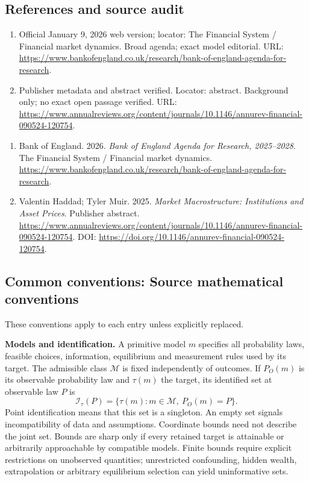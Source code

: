\documentclass[11pt,a4paper]{article}
\begin{document}
\subsection*{References and source audit}
\begin{enumerate}
\item Official January 9, 2026 web version; locator: The Financial System / Financial market dynamics. Broad agenda; exact model editorial. URL: \url{https://www.bankofengland.co.uk/research/bank-of-england-agenda-for-research}.
\item Publisher metadata and abstract verified. Locator: abstract. Background only; no exact open passage verified. URL: \url{https://www.annualreviews.org/content/journals/10.1146/annurev-financial-090524-120754}.
\end{enumerate}
\begin{enumerate}\raggedright
\item\hypertarget{definitions:source:30007598:1}{} Bank of England. 2026. \emph{Bank of England Agenda for Research, 2025–2028}. The Financial System / Financial market dynamics.
\url{https://www.bankofengland.co.uk/research/bank-of-england-agenda-for-research}.
\item\hypertarget{definitions:source:30007598:2}{} Valentin Haddad; Tyler Muir. 2025. \emph{Market Macrostructure: Institutions and Asset Prices}. Publisher abstract.
\url{https://www.annualreviews.org/content/journals/10.1146/annurev-financial-090524-120754}.
DOI: \url{https://doi.org/10.1146/annurev-financial-090524-120754}.
\end{enumerate}

\subsection*{Common conventions: Source mathematical conventions}

These conventions apply to each entry unless explicitly replaced.

\textbf{Models and identification.} A primitive model \(m\) specifies all probability laws, feasible choices, information, equilibrium and measurement rules used by its target. The admissible class \(\mathcal M\) is fixed independently of outcomes. If \(P_O(m)\) is its observable probability law and \(\tau(m)\) the target, its identified set at observable law \(P\) is
\[
 \mathcal I_\tau(P)=\{\tau(m):m\in\mathcal M,\ P_O(m)=P\}.
\]
Point identification means that this set is a singleton. An empty set signals incompatibility of data and assumptions. Coordinate bounds need not describe the joint set. Bounds are sharp only if every retained target is attainable or arbitrarily approachable by compatible models. Finite bounds require explicit restrictions on unobserved quantities; unrestricted confounding, hidden wealth, extrapolation or arbitrary equilibrium selection can yield uninformative sets.
\end{document}
